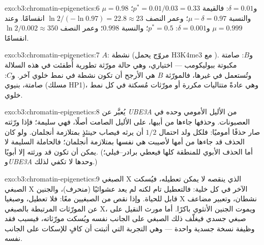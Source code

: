 \begin{solution}{exo:b3:chromatin-epigenetics:6}
$\mu = 0.98$ و$\delta = 0.01$: فالقيمة $p^{*} = 0.01/0.03 = 0.33$؛ والنسبة $\mu -
\delta = 0.97$؛ وعمر النصف $\ln 2/(-\ln 0.97) = 22.8 \approx 23$
انقسامًا. وعند $\mu = 0.999$ و$\delta = 0.001$: $p^{*} = 0.5$؛ والنسبة
$0.998$؛ وعمر النصف $\ln 2 / 0.002 \approx 350$ انقسامًا.
\end{solution}

\begin{solution}{exo:b3:chromatin-epigenetics:7}
$A$: نشطة (مروّج يحمل H3K4me3 مع ). و$B$: صامتة مكبوتة ببوليكومب
---  اختياري، وهي حالة مورّثة تطورية أُطفئت في هذه
السلالة وتُستعمل في غيرها، فالمورّثة $B$ هي الأرجح أن تكون نشطة في نمط خلوي
آخر. و$C$: صامتة،  بنيوي (مسلك HP1)، وهي عادةً متتاليات
مكررة أو مورّثات مُسكتة في كل نمط خلوي.
\end{solution}

\begin{solution}{exo:b3:chromatin-epigenetics:8}
يُعبَّر عن \emph{UBE3A} من الأليل الأمومي وحده في العصبونات. وحذفها
جاءها من أبيها، على الأليل الصامت أصلًا، فهي سليمة؛ فإذا ورّثته صار
حذفًا أموميًا: فلكل ولد احتمال $1/2$ أن يرثه فيصاب حينئذٍ بمتلازمة
أنجلمان. ولو كان الحذف قد جاءها من أمها لأصيبت هي نفسها بمتلازمة
أنجلمان؛ فالحاملة السليمة لا يمكن أن تكون قد ورثته إلا أبويًا. (أما
الحذف الأبوي للمنطقة كلها فيعطي برادر--فيلي؛ و\emph{UBE3A} وحدها لا
تكفي لذلك.)
\end{solution}

\begin{solution}{exo:b3:chromatin-epigenetics:9}
الصبغي X الذي ينقصه \emph{} لا يمكن تعطيله، فيُسكت الصبغي X
الآخر في كل خلية: فالتعطيل تام لكنه لم يعد عشوائيًا (منحرف)، والجنين
قابل للحياة. وإذا نقص \emph{} من الصبغيين معًا: فلا تعطيل، وصبغيا
X نشطان، وتعبير مضاعف عن المورّثات المرتبطة بالصبغي X، ويموت الجنين الأنثوي
باكرًا. أما مورث \emph{} النقيل على صبغي جسدي فيغلّف ذلك الصبغي
على الجانب نفسه ويُسكت مورّثاته، فيسبب فقد وظيفة نسخة جسدية واحدة ---
وهي التجربة التي أثبتت أن \emph{} كافٍ للإسكات على الجانب نفسه.
\end{solution}

